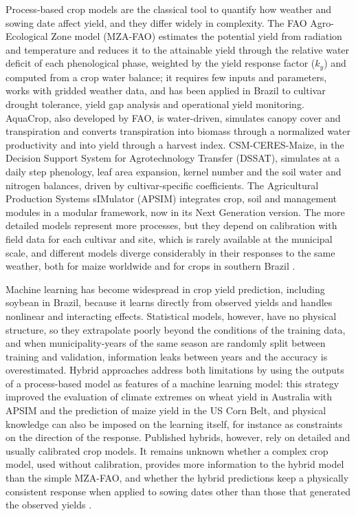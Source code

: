 \documentclass[10pt,a4paper]{article}
\begin{document}
Process-based crop models are the classical tool to quantify how weather and sowing date affect yield,
and they differ widely in complexity. The FAO Agro-Ecological Zone model (MZA-FAO) estimates the
potential yield from radiation and temperature and reduces it to the attainable yield through the
relative water deficit of each phenological phase, weighted by the yield response factor ($k_y$) and
computed from a crop water balance; it requires few inputs and parameters, works with gridded weather
data, and has been applied in Brazil to cultivar drought tolerance, yield gap analysis and operational
yield monitoring. AquaCrop, also developed by FAO, is water-driven,
simulates canopy cover and transpiration and converts transpiration into biomass through a normalized
water productivity and into yield through a harvest index. CSM-CERES-Maize, in the Decision Support
System for Agrotechnology Transfer (DSSAT), simulates at a daily step phenology, leaf area expansion,
kernel number and the soil water and nitrogen balances, driven by cultivar-specific coefficients.
The Agricultural Production Systems sIMulator (APSIM) integrates crop, soil and management modules in
a modular framework, now in its Next Generation version. The more detailed models represent more
processes, but they depend on calibration with field data for each cultivar and site, which is rarely
available at the municipal scale, and different models diverge considerably in their responses to
the same weather, both for maize worldwide and for crops in southern Brazil \citep{doorenbos1979,
allen1998, battisti2015, duarte2019, noia2020, noia2024, steduto2009, kelly2021, jones2003,
holzworth2014, bassu2014, battisti2017, seidel2018}.

Machine learning has become widespread in crop yield prediction, including soybean in Brazil, because
it learns directly from observed yields and handles nonlinear and interacting effects. Statistical
models, however, have no
physical structure, so they extrapolate poorly beyond the conditions of the training data, and when
municipality-years of the same season are randomly split between training and validation, information
leaks between years and the accuracy is overestimated. Hybrid approaches address both limitations by
using the outputs of a process-based model as features of a machine learning model: this strategy
improved the evaluation of climate extremes on wheat yield in Australia with APSIM and the prediction
of maize yield in the US Corn Belt, and physical knowledge can also be imposed on the learning itself,
for instance as constraints on the direction of the response. Published hybrids, however, rely on
detailed and usually calibrated crop models. It remains unknown whether a complex crop model, used
without calibration, provides more information to the hybrid model than the simple MZA-FAO, and whether
the hybrid predictions keep a physically consistent response when applied to sowing dates other than
those that generated the observed yields \citep{vanklompenburg2020, schwalbert2020, vonbloh2023,
lobell2010, roberts2017, kapoor2023, feng2019, shahhosseini2021, karpatne2017}.
\end{document}
